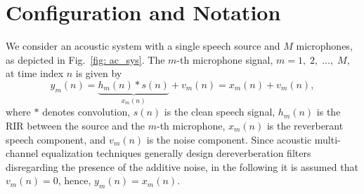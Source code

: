 \documentclass[10pt]{IEEEtran}
\begin{document}
\section{Configuration and Notation}
\label{sec: conf}
We consider an acoustic system with a single speech source and $M$ microphones, as depicted in Fig.~\ref{fig: ac_sys}.
The $m$-th microphone signal, $m = 1, \; 2, \; \ldots, \; M,$ at time index $n$ is given by
\begin{equation}
  y_m(n) = \underbrace{h_m(n) \ast s(n)}_{x_m(n)} + v_m(n)  = x_m(n) + v_m(n),
\end{equation}
where $\ast$ denotes convolution, $s(n)$ is the clean speech signal, $h_m(n)$ is the RIR between the source and the $m$-th microphone, $x_{m}(n)$ is the reverberant speech component, and $v_{m}(n)$ is the noise component.
Since acoustic multi-channel equalization techniques generally design dereverberation filters disregarding the presence of the additive noise, in the following it is assumed that $v_m(n) = 0$, hence, $y_m(n) = x_m(n)$.
\end{document}

